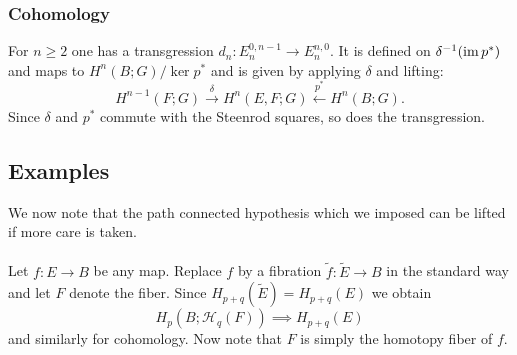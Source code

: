 \documentclass[11pt]{article}
\begin{document}
\begin{Jandr SSS notes}
	\subsubsection{Cohomology}
For $n\geq 2$ one has a transgression $d_n:E_n^{0,n-1}\to E_n^{n,0}$. It is defined on $\delta^{-1}(\operatorname{im} p^*)$ and maps to $H^n(B;G)/\ker p^*$ and is given by applying $\delta$ and lifting:
\[H^{n-1}(F;G)\overset{\delta}{\to}H^n(E,F;G)\overset{p^*}{\longleftarrow}H^n(B;G).\]
Since $\delta$ and $p^*$ commute with the Steenrod squares, so does the transgression.


	\subsection{Examples}
We now note that the path connected hypothesis which we imposed can be lifted if more care is taken.\\
\\
Let $f:E\to B$ be any map. Replace $f$ by a fibration $\tilde{f}:\tilde{E}\to B$ in the standard way and let $F$ denote the fiber. Since $H_{p+q}(\tilde{E})=H_{p+q}(E)$ we obtain
\[H_p(B;\mathscr{H}_q(F))\implies H_{p+q}(E)\]
and similarly for cohomology. Now note that $F$ is simply the homotopy fiber of $f$.



\end{Jandr SSS notes}
\end{document}
